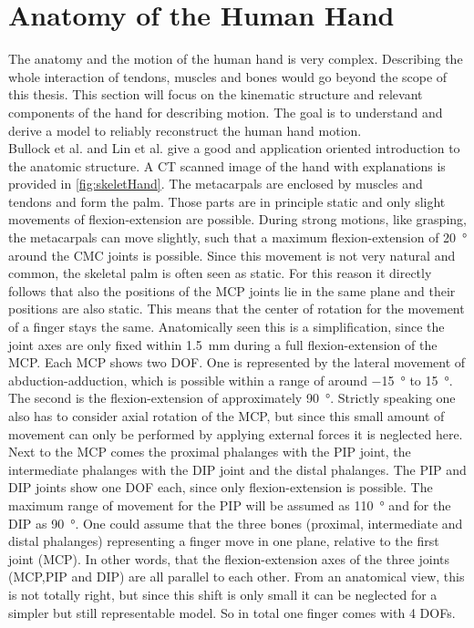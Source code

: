 \section{Anatomy of the Human Hand} \label{sec:anatomy}
The anatomy and the motion of the human hand is very complex. Describing the whole interaction of tendons, muscles and bones would go beyond the scope of this thesis. This section will focus on the kinematic structure and relevant components of the hand for describing motion. The goal is to understand and derive a model to reliably reconstruct the human hand motion.\\
Bullock et al. \cite{bullock2012assessing} and Lin et al. \cite{lin2000modeling} give a good and application oriented introduction to the anatomic structure. A \ac{CT} scanned image of the hand with explanations is provided in \ref{fig:skeletHand}. The metacarpals are enclosed by muscles and tendons and form the palm. Those parts are in principle static and only slight movements of flexion-extension are possible. During strong motions, like grasping, the metacarpals can move slightly, such that a maximum flexion-extension of \SI{20}{\degree} around the \ac{CMC} joints is possible. Since this movement is not very natural and common, the skeletal palm is often seen as static. For this reason it directly follows that also the positions of the \ac{MCP} joints lie in the same plane and their positions are also static. This means that the center of rotation for the movement of a finger stays the same. Anatomically seen this is a simplification, since the joint axes are only fixed within \SI{1.5}{mm} during a full flexion-extension of the \ac{MCP}. 
Each \ac{MCP} shows two \ac{DOF}. One is represented by the lateral movement of abduction-adduction, which is possible within a range of around \SI{-15}{\degree} to \SI{+15}{\degree}. The second is the flexion-extension of approximately \SI{90}{\degree}. Strictly speaking one also has to consider axial rotation of the MCP, but since this small amount of movement can only be performed by applying external forces it is neglected here. Next to the \ac{MCP} comes the proximal phalanges with the \ac{PIP} joint, the intermediate phalanges with the \ac{DIP} joint and the distal phalanges. The \ac{PIP} and \ac{DIP} joints show one \ac{DOF} each, since only flexion-extension is possible. The maximum range of movement for the \ac{PIP} will be assumed as \SI{110}{\degree} and for the \ac{DIP} as \SI{90}{\degree}. One could assume that the three bones (proximal, intermediate and distal phalanges) representing a finger move in one plane, relative to the first joint (\ac{MCP}). In other words, that the flexion-extension axes of the three joints (\ac{MCP},\ac{PIP} and \ac{DIP}) are all parallel to each other. From an anatomical view, this is not totally right, but since this shift is only small it can be neglected for a simpler but still representable model. So in total one finger comes with 4 \acp{DOF}. 

